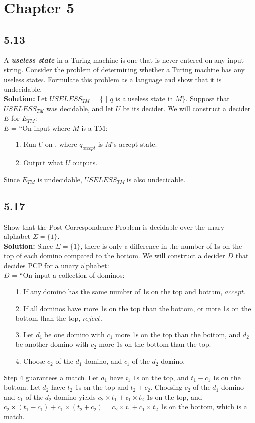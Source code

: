 \section{Chapter 5}

\subsection*{5.13} A \emph{\textbf{useless state}} in a Turing machine is one that is never entered on any input string. Consider the problem of determining whether a Turing machine has any useless states. Formulate this problem as a language and show that it is undecidable.
\\
\textbf{Solution:} Let $USELESS_{TM}$ = \{ $|$ $q$ is a useless state in $M$\}. Suppose that $USELESS_{TM}$ was decidable, and let $U$ be its decider. We will construct a decider $E$ for $E_{TM}$:
\\
$E$ = ``On input  where $M$ is a TM:
\begin{enumerate}
\itemsep0em
\item[1.]Run $U$ on , where $q_{accept}$ is $M$'s accept state.
\item[2.]Output what $U$ outputs.
\end{enumerate}
Since $E_{TM}$ is undecidable, $USELESS_{TM}$ is also undecidable.

\subsection*{5.17} Show that the Post Correspondence Problem is decidable over the unary alphabet $\Sigma = \{1\}$.
\\
\textbf{Solution:} Since $\Sigma = \{1\}$, there is only a difference in the number of 1s on the top of each domino compared to the bottom. We will construct a decider $D$ that decides PCP for a unary alphabet:
\\
$D$ = ``On input a collection of dominos:
\begin{enumerate}
\itemsep0em
\item[1.]If any domino has the same number of 1s on the top and bottom, $accept$.
\item[2.]If all dominos have more 1s on the top than the bottom, or more 1s on the bottom than the top, $reject$.
\item[3.]Let $d_1$ be one domino with $c_1$ more 1s on the top than the bottom, and $d_2$ be another domino with $c_2$ more 1s on the bottom than the top.
\item[4.]Choose $c_2$ of the $d_1$ domino, and $c_1$ of the $d_2$ domino.
\end{enumerate}
Step 4 guarantees a match. Let $d_1$ have $t_1$ 1s on the top, and $t_1 - c_1$ 1s on the bottom. Let $d_2$ have $t_2$ 1s on the top and $t_2 + c_2$. Choosing $c_2$ of the $d_1$ domino and $c_1$ of the $d_2$ domino yields $c_2 \times t_1 + c_1 \times t_2$ 1s on the top, and $c_2 \times (t_1 - c_1) + c_1 \times (t_2 + c_2) = c_2 \times t_1 + c_1 \times t_2$ 1s on the bottom, which is a match.

